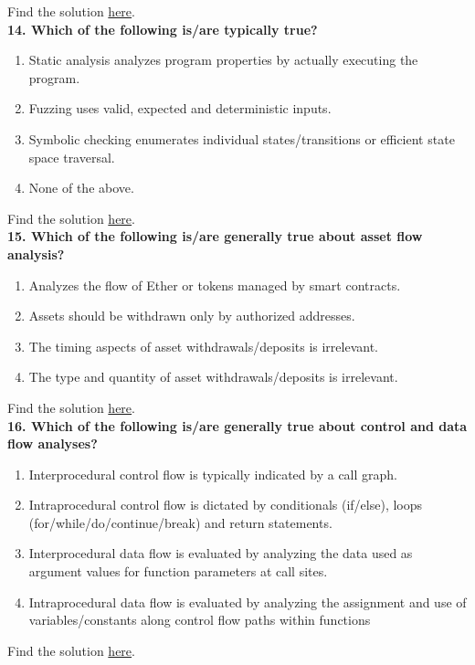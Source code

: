 Find the solution \hyperref[sec:exam6_q13]{here}.\\

\textbf{14. Which of the following is/are typically true?}

\begin{enumerate}[label=\Alph*.]
    \item Static analysis analyzes program properties by actually executing the program.
    \item Fuzzing uses valid, expected and deterministic inputs.
    \item Symbolic checking enumerates individual states/transitions or efficient state space traversal.
    \item None of the above.
\end{enumerate}

Find the solution \hyperref[sec:exam6_q14]{here}.\\

\textbf{15. Which of the following is/are generally true about asset flow analysis?}

\begin{enumerate}[label=\Alph*.]
    \item Analyzes the flow of Ether or tokens managed by smart contracts.
    \item Assets should be withdrawn only by authorized addresses.
    \item The timing aspects of asset withdrawals/deposits is irrelevant.
    \item The type and quantity of asset withdrawals/deposits is irrelevant.
\end{enumerate}

Find the solution \hyperref[sec:exam6_q15]{here}.\\

\textbf{16. Which of the following is/are generally true about control and data flow analyses?}

\begin{enumerate}[label=\Alph*.]
    \item Interprocedural control flow is typically indicated by a call graph.
    \item Intraprocedural control flow is dictated by conditionals (if/else), loops (for/while/do/continue/break) and return statements.
    \item Interprocedural data flow is evaluated by analyzing the data used as argument values for function parameters at call sites.
    \item Intraprocedural data flow is evaluated by analyzing the assignment and use of variables/constants along control flow paths within functions
\end{enumerate}

Find the solution \hyperref[sec:exam6_q16]{here}.\\

